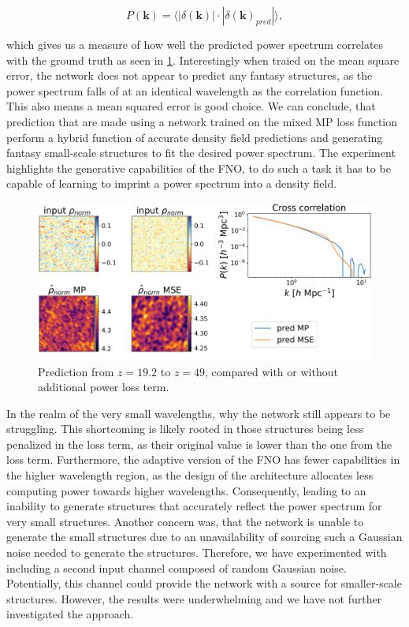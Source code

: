 \documentclass{article}
\begin{document}
\begin{equation}
    P(\mathbf{k}) = \langle |\delta(\mathbf{k})| \cdot |\delta(\mathbf{k})_{pred}| \rangle,
\end{equation}

which gives us a measure of how well the predicted power spectrum correlates with the ground truth as seen in \ref{fig:power-loss-corr}. Interestingly when traied on the mean square error, the network does not appear to predict any fantasy structures, as the power spectrum falls of at an identical wavelength as the correlation function. This also means a mean squared error is good choice. We can conclude, that prediction that are made using a network trained on the mixed MP loss function perform a hybrid function of accurate density field predictions and generating fantasy small-scale structures to fit the desired power spectrum. The experiment highlights the generative capabilities of the FNO, to do such a task it has to be capable of learning to imprint a power spectrum into a density field.


\begin{figure}[h]
    \centering
    \includegraphics[width=0.8\linewidth]{img/compare_loss_correlation.png}
    \caption{Prediction from $z=19.2$ to $z=49$, compared with or without additional power loss term.}
    \label{fig:power-loss-corr}
\end{figure}

In the realm of the very small wavelengths, why the network still appears to be struggling. This shortcoming is likely rooted in those structures being less penalized in the loss term, as their original value is lower than the one from the loss term. Furthermore, the adaptive version of the FNO has fewer capabilities in the higher wavelength region, as the design of the architecture allocates less computing power towards higher wavelengths. Consequently, leading to an inability to generate structures that accurately reflect the power spectrum for very small structures. Another concern was, that the network is unable to generate the small structures due to an unavailability of sourcing such a Gaussian noise needed to generate the structures. Therefore, we have experimented with including a second  input channel composed of random Gaussian noise. Potentially, this channel could provide the network with a source for smaller-scale structures. However, the results were underwhelming and we have not further investigated the approach.
\end{document}
